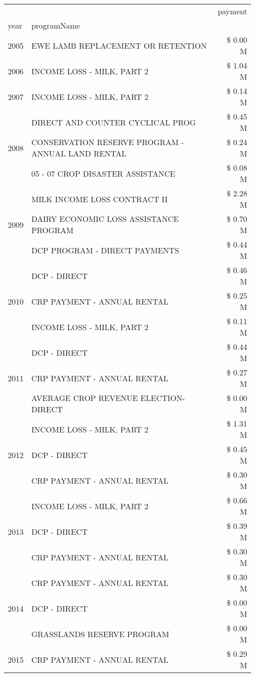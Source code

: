 \begin{tabular}{llr}
\toprule
 &  & payment \\
year & programName &  \\
\midrule
2005 & EWE LAMB REPLACEMENT OR RETENTION & \$ 0.00 M \\
\cline{1-3}
2006 & INCOME LOSS - MILK, PART 2 & \$ 1.04 M \\
\cline{1-3}
2007 & INCOME LOSS - MILK, PART 2 & \$ 0.14 M \\
\cline{1-3}
\multirow[t]{3}{*}{2008} & DIRECT AND COUNTER CYCLICAL PROG & \$ 0.45 M \\
 & CONSERVATION RESERVE PROGRAM - ANNUAL LAND RENTAL & \$ 0.24 M \\
 & 05 - 07 CROP DISASTER ASSISTANCE & \$ 0.08 M \\
\cline{1-3}
\multirow[t]{3}{*}{2009} & MILK INCOME LOSS CONTRACT II & \$ 2.28 M \\
 & DAIRY ECONOMIC LOSS ASSISTANCE PROGRAM & \$ 0.70 M \\
 & DCP PROGRAM - DIRECT PAYMENTS & \$ 0.44 M \\
\cline{1-3}
\multirow[t]{3}{*}{2010} & DCP - DIRECT & \$ 0.46 M \\
 & CRP PAYMENT - ANNUAL RENTAL & \$ 0.25 M \\
 & INCOME LOSS - MILK, PART 2 & \$ 0.11 M \\
\cline{1-3}
\multirow[t]{3}{*}{2011} & DCP - DIRECT & \$ 0.44 M \\
 & CRP PAYMENT - ANNUAL RENTAL & \$ 0.27 M \\
 & AVERAGE CROP REVENUE ELECTION-DIRECT & \$ 0.00 M \\
\cline{1-3}
\multirow[t]{3}{*}{2012} & INCOME LOSS - MILK, PART 2 & \$ 1.31 M \\
 & DCP - DIRECT & \$ 0.45 M \\
 & CRP PAYMENT - ANNUAL RENTAL & \$ 0.30 M \\
\cline{1-3}
\multirow[t]{3}{*}{2013} & INCOME LOSS - MILK, PART 2 & \$ 0.66 M \\
 & DCP - DIRECT & \$ 0.39 M \\
 & CRP PAYMENT - ANNUAL RENTAL & \$ 0.30 M \\
\cline{1-3}
\multirow[t]{3}{*}{2014} & CRP PAYMENT - ANNUAL RENTAL & \$ 0.30 M \\
 & DCP - DIRECT & \$ 0.00 M \\
 & GRASSLANDS RESERVE PROGRAM & \$ 0.00 M \\
\cline{1-3}
\multirow[t]{3}{*}{2015} & CRP PAYMENT - ANNUAL RENTAL & \$ 0.29 M \\

\end{tabular}
